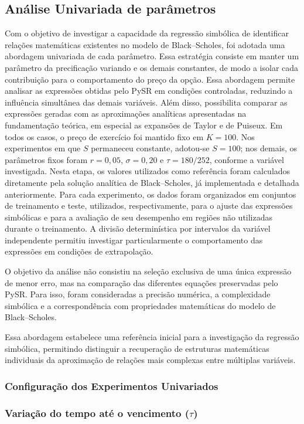 \subsection{Análise Univariada de parâmetros}
Com o objetivo de investigar a capacidade da regressão simbólica de identificar relações matemáticas existentes no modelo de Black--Scholes, foi adotada uma abordagem univariada de cada parâmetro. Essa estratégia consiste em manter um parâmetro da precificação variando e os demais constantes, de modo a isolar cada contribuição para o comportamento do preço da opção. Essa abordagem permite analisar as expressões obtidas pelo PySR em condições controladas, reduzindo a influência simultânea das demais variáveis. Além disso, possibilita comparar as expressões
geradas com as aproximações analíticas apresentadas
na fundamentação teórica, em especial as
expansões de Taylor e de Puiseux. Em todos os casos,
o preço de exercício foi mantido fixo em $K=100$.
Nos experimentos em que $S$ permaneceu constante,
adotou-se $S=100$; nos demais, os parâmetros
fixos foram $r=0{,}05$, $\sigma=0{,}20$ e
$\tau=180/252$, conforme a variável investigada. Nesta etapa, os valores utilizados como referência foram
calculados diretamente pela solução analítica
de Black--Scholes, já implementada e detalhada anteriormente. Para cada experimento, os dados foram organizados em conjuntos de treinamento e teste, utilizados, respectivamente, para o ajuste das expressões simbólicas e para a avaliação de seu desempenho em regiões não utilizadas durante o treinamento. A divisão determinística por intervalos da variável independente permitiu investigar particularmente o comportamento das expressões em condições de extrapolação.

O objetivo da análise não consistiu na seleção exclusiva de uma única expressão de menor erro, mas na comparação das diferentes equações preservadas pelo PySR. Para isso, foram consideradas a precisão numérica, a complexidade simbólica e a correspondência com propriedades matemáticas do modelo de Black--Scholes. 

Essa abordagem estabelece uma referência inicial
para a investigação da regressão simbólica,
permitindo distinguir a recuperação de estruturas
matemáticas individuais da aproximação de relações
mais complexas entre múltiplas variáveis.
\subsubsection{Configuração dos Experimentos Univariados}
\subsubsection*{Variação do tempo até o vencimento ($\tau$)}

